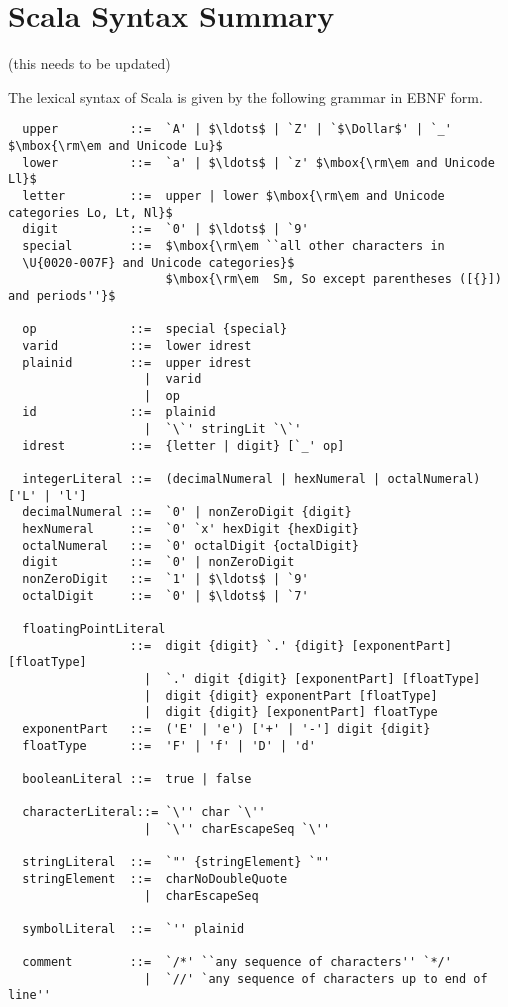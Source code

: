 \appendix
\chapter{Scala Syntax Summary}

(this needs to be updated)

The lexical syntax of Scala is given by the following grammar in EBNF
form.

\begin{lstlisting}
  upper          ::=  `A' | $\ldots$ | `Z' | `$\Dollar$' | `_' $\mbox{\rm\em and Unicode Lu}$
  lower          ::=  `a' | $\ldots$ | `z' $\mbox{\rm\em and Unicode Ll}$
  letter         ::=  upper | lower $\mbox{\rm\em and Unicode categories Lo, Lt, Nl}$
  digit          ::=  `0' | $\ldots$ | `9'
  special        ::=  $\mbox{\rm\em ``all other characters in
  \U{0020-007F} and Unicode categories}$
                      $\mbox{\rm\em  Sm, So except parentheses ([{}]) and periods''}$

  op             ::=  special {special} 
  varid          ::=  lower idrest
  plainid        ::=  upper idrest
                   |  varid
                   |  op
  id             ::=  plainid
                   |  `\`' stringLit `\`'
  idrest         ::=  {letter | digit} [`_' op]

  integerLiteral ::=  (decimalNumeral | hexNumeral | octalNumeral) ['L' | 'l']
  decimalNumeral ::=  `0' | nonZeroDigit {digit}
  hexNumeral     ::=  `0' `x' hexDigit {hexDigit}
  octalNumeral   ::=  `0' octalDigit {octalDigit}
  digit          ::=  `0' | nonZeroDigit
  nonZeroDigit   ::=  `1' | $\ldots$ | `9'
  octalDigit     ::=  `0' | $\ldots$ | `7'

  floatingPointLiteral 
                 ::=  digit {digit} `.' {digit} [exponentPart] [floatType]
                   |  `.' digit {digit} [exponentPart] [floatType]
                   |  digit {digit} exponentPart [floatType]
                   |  digit {digit} [exponentPart] floatType
  exponentPart   ::=  ('E' | 'e') ['+' | '-'] digit {digit}
  floatType      ::=  'F' | 'f' | 'D' | 'd'

  booleanLiteral ::=  true | false

  characterLiteral::= `\'' char `\''
                   |  `\'' charEscapeSeq `\''

  stringLiteral  ::=  `"' {stringElement} `"'
  stringElement  ::=  charNoDoubleQuote 
                   |  charEscapeSeq

  symbolLiteral  ::=  `'' plainid

  comment        ::=  `/*' ``any sequence of characters'' `*/'
                   |  `//' `any sequence of characters up to end of line''
\end{lstlisting}

